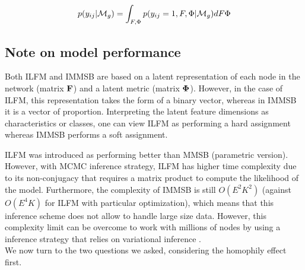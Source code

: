 \begin{equation}
p(y_{ij} | \mathcal{M}_g) = \int_{F,\Phi} p(y_{ij}=1, F,\Phi |\mathcal{M}_g) dF\Phi
\end{equation}


\subsection{Note on model performance}

Both ILFM and IMMSB are based on a latent representation of each node in the network (matrix $\mathbf{F}$) and a latent metric (matrix $\mathbf{\Phi}$). However, in the case of ILFM, this representation takes the form of a binary vector, whereas in IMMSB it is a vector of proportion. Interpreting the latent feature dimensions as characteristics or classes, one can view ILFM as performing a hard assignment whereas IMMSB performs a soft assignment. 

ILFM was introduced as performing better than MMSB (parametric version). However, with MCMC inference strategy, ILFM has higher time complexity due to its non-conjugacy that requires a matrix product to compute the likelihood of the model. Furthermore, the complexity of IMMSB is still $O(E^2K^2)$ (against $O(E^4K)$ for ILFM with particular optimization), which means that this inference scheme  does not allow to handle large size data. However, this complexity limit can be overcome  to work with millions of nodes by using a inference strategy that relies on variational inference \cite{gopalan2013efficient}.\\

 We now turn to the two questions we asked, considering the homophily effect first.
